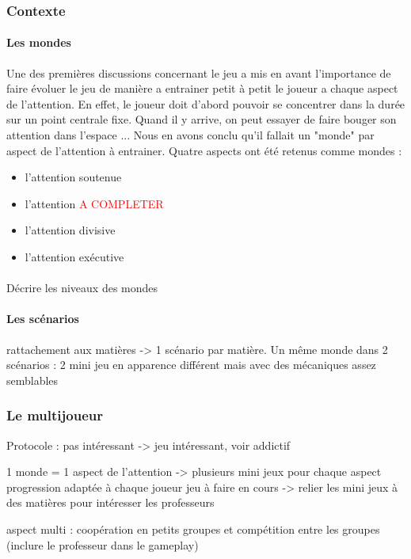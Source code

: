 \newpage
\subsubsection{Contexte}

\paragraph{Les mondes}Une des premières discussions concernant le jeu a mis en avant l'importance de faire évoluer le jeu de manière a entrainer petit à petit le joueur a chaque aspect
de l'attention. En effet, le joueur doit d'abord pouvoir se concentrer dans la durée sur un point centrale fixe. Quand il y arrive, on peut essayer de faire bouger son attention dans
l'espace ... Nous en avons conclu qu'il fallait un "monde" par aspect de l'attention à entrainer. Quatre aspects ont été retenus comme mondes :
\begin{itemize}
\item l'attention soutenue
\item l'attention \textcolor{red}{A COMPLETER}
\item l'attention divisive
\item l'attention exécutive
\end{itemize}

\paragraph{}Décrire les niveaux des mondes

\paragraph{Les scénarios} rattachement aux matières -> 1 scénario par matière. Un même monde dans 2 scénarios : 2 mini jeu en apparence différent mais avec des mécaniques assez
semblables

\subsubsection{Le multijoueur}



Protocole : pas intéressant -> jeu intéressant, voir addictif

1 monde = 1 aspect de l'attention -> plusieurs mini jeux pour chaque aspect
progression adaptée à chaque joueur
jeu à faire en cours -> relier les mini jeux à des matières pour intéresser les professeurs

aspect multi : coopération en petits groupes et compétition entre les groupes (inclure le professeur dans le gameplay)